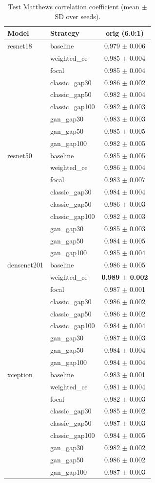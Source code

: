 \begin{table}[htbp]
\centering
\caption{Test Matthews correlation coefficient (mean $\pm$ SD over seeds).}
\label{tab:mcc}
\begin{tabular}{llc}
\toprule
Model & Strategy & orig (6.0:1) \\
\midrule
resnet18 & baseline & 0.979 $\pm$ 0.006 \\
 & weighted\_ce & 0.985 $\pm$ 0.004 \\
 & focal & 0.985 $\pm$ 0.004 \\
 & classic\_gap30 & 0.986 $\pm$ 0.002 \\
 & classic\_gap50 & 0.982 $\pm$ 0.004 \\
 & classic\_gap100 & 0.982 $\pm$ 0.003 \\
 & gan\_gap30 & 0.983 $\pm$ 0.003 \\
 & gan\_gap50 & 0.985 $\pm$ 0.005 \\
 & gan\_gap100 & 0.982 $\pm$ 0.005 \\
\addlinespace
resnet50 & baseline & 0.985 $\pm$ 0.005 \\
 & weighted\_ce & 0.986 $\pm$ 0.004 \\
 & focal & 0.983 $\pm$ 0.007 \\
 & classic\_gap30 & 0.984 $\pm$ 0.004 \\
 & classic\_gap50 & 0.986 $\pm$ 0.003 \\
 & classic\_gap100 & 0.982 $\pm$ 0.003 \\
 & gan\_gap30 & 0.985 $\pm$ 0.003 \\
 & gan\_gap50 & 0.984 $\pm$ 0.005 \\
 & gan\_gap100 & 0.985 $\pm$ 0.004 \\
\addlinespace
densenet201 & baseline & 0.986 $\pm$ 0.005 \\
 & weighted\_ce & \textbf{0.989 $\pm$ 0.002} \\
 & focal & 0.987 $\pm$ 0.001 \\
 & classic\_gap30 & 0.986 $\pm$ 0.002 \\
 & classic\_gap50 & 0.986 $\pm$ 0.002 \\
 & classic\_gap100 & 0.984 $\pm$ 0.004 \\
 & gan\_gap30 & 0.987 $\pm$ 0.003 \\
 & gan\_gap50 & 0.984 $\pm$ 0.004 \\
 & gan\_gap100 & 0.984 $\pm$ 0.004 \\
\addlinespace
xception & baseline & 0.983 $\pm$ 0.001 \\
 & weighted\_ce & 0.981 $\pm$ 0.004 \\
 & focal & 0.982 $\pm$ 0.003 \\
 & classic\_gap30 & 0.985 $\pm$ 0.002 \\
 & classic\_gap50 & 0.987 $\pm$ 0.003 \\
 & classic\_gap100 & 0.984 $\pm$ 0.005 \\
 & gan\_gap30 & 0.982 $\pm$ 0.002 \\
 & gan\_gap50 & 0.986 $\pm$ 0.002 \\
 & gan\_gap100 & 0.987 $\pm$ 0.003 \\
\bottomrule
\end{tabular}
\end{table}
